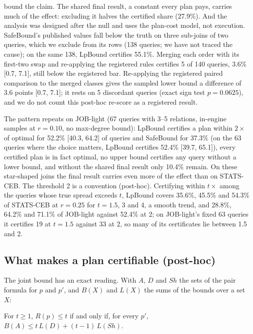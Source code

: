 \documentclass[sigconf, nonacm]{acmart}
\begin{document}
bound the claim. The shared final result, a constant every plan pays, carries
much of the effect: excluding it halves the certified share (27.9\%). And the
analysis was designed after the null and uses the plan-cost model, not
execution. SafeBound's published values fall below the truth on three
sub-joins of two queries, which we exclude from its rows (138 queries; we have
not traced the cause); on the same 138, LpBound certifies 55.1\%. Merging
each order with its first-two swap and re-applying the registered rules
certifies 5 of 140 queries, $3.6\%$ [0.7, 7.1], still below the registered bar.
Re-applying the registered paired comparison to the merged classes gives the
sampled lower bound a difference of $3.6$ points [0.7, 7.1]; it rests on 5
discordant queries (exact sign test $p=0.0625$), and we do not count this
post-hoc re-score as a registered result.

The pattern repeats on JOB-light (67 queries with 3--5 relations, in-engine
samples at $r{=}0.10$, no max-degree bound): LpBound certifies a plan within
$2\times$ of optimal for 52.2\% [40.3, 64.2] of queries and SafeBound for
37.3\% (on the 63 queries where the choice matters, LpBound certifies
52.4\% [39.7, 65.1]), every certified plan is in fact optimal, no upper bound certifies any
query without a lower bound, and without the shared final result only 10.4\%
remain. On these star-shaped joins the final result carries even more of the
effect than on STATS-CEB. The threshold 2 is a convention (post-hoc).
Certifying within $t\times$ among the queries whose true spread exceeds $t$,
LpBound covers 35.6\%, 45.5\% and 54.3\% of STATS-CEB at $r{=}0.25$ for
$t=1.5$, 3 and 4, a smooth trend, and 28.8\%, 64.2\% and 71.1\% of JOB-light
against 52.4\% at 2; on JOB-light's fixed 63 queries it certifies 19 at
$t=1.5$ against 33 at 2, so many of its certificates lie between 1.5 and 2.

\subsection{What makes a plan certifiable (post-hoc)}
The joint bound has an exact reading. With $A$, $D$ and $\mathit{Sh}$ the sets
of the pair formula for $p$ and $p'$, and $B(X)$ and $L(X)$ the sums of the
bounds over a set $X$:

\begin{proposition}
For $t\ge1$, $R(p)\le t$ if and only if, for every $p'$,
$B(A) \le t\,L(D) + (t-1)\,L(\mathit{Sh})$.
\end{proposition}
\end{document}
